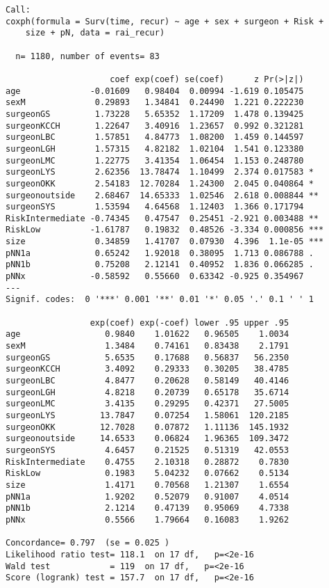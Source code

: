 \documentclass[
  letterpaper,
  DIV=11,
  numbers=noendperiod]{scrartcl}
\begin{document}
\begin{verbatim}
Call:
coxph(formula = Surv(time, recur) ~ age + sex + surgeon + Risk + 
    size + pN, data = rai_recur)

  n= 1180, number of events= 83 

                     coef exp(coef) se(coef)      z Pr(>|z|)    
age              -0.01609   0.98404  0.00994 -1.619 0.105475    
sexM              0.29893   1.34841  0.24490  1.221 0.222230    
surgeonGS         1.73228   5.65352  1.17209  1.478 0.139425    
surgeonKCCH       1.22647   3.40916  1.23657  0.992 0.321281    
surgeonLBC        1.57851   4.84773  1.08200  1.459 0.144597    
surgeonLGH        1.57315   4.82182  1.02104  1.541 0.123380    
surgeonLMC        1.22775   3.41354  1.06454  1.153 0.248780    
surgeonLYS        2.62356  13.78474  1.10499  2.374 0.017583 *  
surgeonOKK        2.54183  12.70284  1.24300  2.045 0.040864 *  
surgeonoutside    2.68467  14.65333  1.02546  2.618 0.008844 ** 
surgeonSYS        1.53594   4.64568  1.12403  1.366 0.171794    
RiskIntermediate -0.74345   0.47547  0.25451 -2.921 0.003488 ** 
RiskLow          -1.61787   0.19832  0.48526 -3.334 0.000856 ***
size              0.34859   1.41707  0.07930  4.396  1.1e-05 ***
pNN1a             0.65242   1.92018  0.38095  1.713 0.086788 .  
pNN1b             0.75208   2.12141  0.40952  1.836 0.066285 .  
pNNx             -0.58592   0.55660  0.63342 -0.925 0.354967    
---
Signif. codes:  0 '***' 0.001 '**' 0.01 '*' 0.05 '.' 0.1 ' ' 1

                 exp(coef) exp(-coef) lower .95 upper .95
age                 0.9840    1.01622   0.96505    1.0034
sexM                1.3484    0.74161   0.83438    2.1791
surgeonGS           5.6535    0.17688   0.56837   56.2350
surgeonKCCH         3.4092    0.29333   0.30205   38.4785
surgeonLBC          4.8477    0.20628   0.58149   40.4146
surgeonLGH          4.8218    0.20739   0.65178   35.6714
surgeonLMC          3.4135    0.29295   0.42371   27.5005
surgeonLYS         13.7847    0.07254   1.58061  120.2185
surgeonOKK         12.7028    0.07872   1.11136  145.1932
surgeonoutside     14.6533    0.06824   1.96365  109.3472
surgeonSYS          4.6457    0.21525   0.51319   42.0553
RiskIntermediate    0.4755    2.10318   0.28872    0.7830
RiskLow             0.1983    5.04232   0.07662    0.5134
size                1.4171    0.70568   1.21307    1.6554
pNN1a               1.9202    0.52079   0.91007    4.0514
pNN1b               2.1214    0.47139   0.95069    4.7338
pNNx                0.5566    1.79664   0.16083    1.9262

Concordance= 0.797  (se = 0.025 )
Likelihood ratio test= 118.1  on 17 df,   p=<2e-16
Wald test            = 119  on 17 df,   p=<2e-16
Score (logrank) test = 157.7  on 17 df,   p=<2e-16
\end{verbatim}
\end{document}
